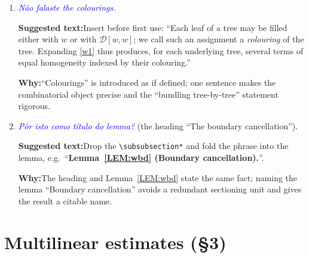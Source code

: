 \documentclass[11pt]{article}
\newcommand{\D}{\mathcal{D}}
\newcommand{\com}[1]{\textit{\textcolor{blue}{#1}}}
\newcommand{\sugg}[1]{\par\smallskip\textbf{Suggested text:}\quad #1}
\newcommand{\why}[1]{\par\smallskip\textbf{Why:}\quad #1\par\medskip}
\begin{document}
\begin{enumerate}[leftmargin=*]
\item[\textbf{L1643}] \com{N\~ao falaste the colourings.}
\sugg{Insert before first use: ``Each leaf of a tree may be filled either
with $w$ or with $\D[w,w]$; we call such an assignment a \emph{colouring} of
the tree. Expanding \eqref{w1} thus produces, for each underlying tree,
several terms of equal homogeneity indexed by their colouring.''}
\why{``Colourings'' is introduced as if defined; one sentence makes the
combinatorial object precise and the ``bundling tree-by-tree'' statement
rigorous.}

\item[\textbf{L1645}] \com{P\^or isto como t\'itulo do lemma?} (the heading
``The boundary cancellation'').
\sugg{Drop the \texttt{\textbackslash subsubsection*} and fold the phrase
into the lemma, e.g.\ ``\textbf{Lemma~\ref{LEM:wbd} (Boundary
cancellation).}''.}
\why{The heading and Lemma~\ref{LEM:wbd} state the same fact; naming the lemma
``Boundary cancellation'' avoids a redundant sectioning unit and gives the
result a citable name.}

\end{enumerate}

\section*{Multilinear estimates (\S3)}
\end{document}
